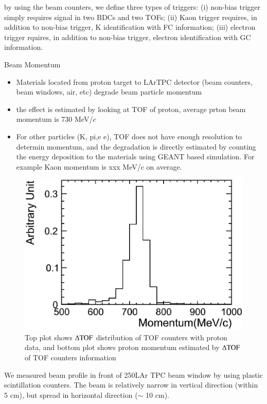 by using the beam counters, we define three types of triggers:
(i) non-bias trigger simply requires signal in two BDCs and two TOFs;
(ii) Kaon trigger requires, in addition to non-bias trigger, K identification with FC information;
(iii) electron trigger rquires, in addition to non-bias trigger, electron identification with GC information.

Beam Momentum
\begin{itemize}
\item Materials located from proton target to LArTPC detector (beam counters, beam windows, air, etc) degrade beam particle momentum
\item the effect is estimated by looking at TOF of proton, average prton beam momentum is 730 MeV/$c$
\item For other particles  (K, pi,e e), TOF does not have enough resolution to determin momentum, and the degradation
is directly estimated by counting the energy deposition to the materials using GEANT based simulation.
For example Kaon momentum is xxx MeV/c on average.
\end{itemize}

\begin{figure}[htbp]
  \begin{center}
    \includegraphics[width=1.0\hsize,clip]{fig/Momentum_proton.eps}
    \caption{Top plot shows $\rm {\Delta TOF}$ distribution of TOF counters with proton data,
      and bottom plot shows proton momentum estimated by $\rm {\Delta TOF}$ of TOF counters information}
    \label{fig:Proton_momentum}
  \end{center}
\end{figure} 

We measured beam profile in front of 250LAr TPC beam window by using plastic scintillation counters.
The beam is relatively narrow in vertical direction (within 5 cm),
but spread in horizontal direction ($\sim$ 10 cm).



